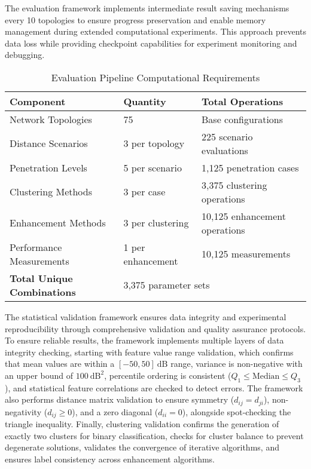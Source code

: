 The evaluation framework implements intermediate result saving mechanisms every 10 topologies to ensure progress preservation and enable memory management during extended computational experiments. This approach prevents data loss while providing checkpoint capabilities for experiment monitoring and debugging.

\begin{table}[h]
\centering
\caption{Evaluation Pipeline Computational Requirements}
\label{tab:eval_pipeline}
\begin{tabular}{|l|l|l|}
\hline
\textbf{Component} & \textbf{Quantity} & \textbf{Total Operations} \\
\hline
Network Topologies & 75 & Base configurations \\
Distance Scenarios & 3 per topology & 225 scenario evaluations \\
Penetration Levels & 5 per scenario & 1,125 penetration cases \\
Clustering Methods & 3 per case & 3,375 clustering operations \\
Enhancement Methods & 3 per clustering & 10,125 enhancement operations \\
Performance Measurements & 1 per enhancement & 10,125 measurements \\
\hline
\textbf{Total Unique Combinations} & \multicolumn{2}{|l|}{3,375 parameter sets} \\
\hline
\end{tabular}
\end{table}

The statistical validation framework ensures data integrity and experimental reproducibility through comprehensive validation and quality assurance protocols. To ensure reliable results, the framework implements multiple layers of data integrity checking, starting with feature value range validation, which confirms that mean values are within a $[-50, 50]~\text{dB}$ range, variance is non-negative with an upper bound of $100~\text{dB}^2$, percentile ordering is consistent ($Q_1 \le \text{Median} \le Q_3$), and statistical feature correlations are checked to detect errors. The framework also performs distance matrix validation to ensure symmetry ($d_{ij} = d_{ji}$), non-negativity ($d_{ij} \ge 0$), and a zero diagonal ($d_{ii} = 0$), alongside spot-checking the triangle inequality. Finally, clustering validation confirms the generation of exactly two clusters for binary classification, checks for cluster balance to prevent degenerate solutions, validates the convergence of iterative algorithms, and ensures label consistency across enhancement algorithms.

